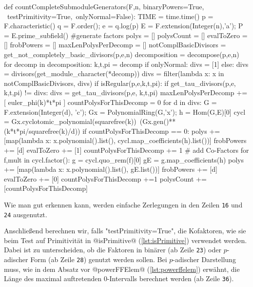 \begin{sagecode}[caption={Aus \url{../Sage/enumeratePCNs.spyx}}]
def countCompleteSubmoduleGenerators(F,n, binaryPowers=True, \
        testPrimitivity=True,\
        onlyNormal=False):
    TIME = time.time()
    p = F.characteristic()
    q = F.order();
    e = q.log(p)
    E = F.extension(Integer(n),'a');
    P = E.prime_subfield()
    #generate factors
    polys = []
    polysCount = []
    evalToZero = []
    frobPowers = []
    maxLenPolysPerDecomp = []
    notComplBasicDivisors = get_not_completely_basic_divisors(p,e,n)
    decomposition = decompose(p,e,n)
    for decomp in decomposition:
        k,t,pi = decomp
        if onlyNormal:
            divs = [1]
        else:
            divs = divisors(get_module_character(*decomp))
            divs = filter(lambda x: x in notComplBasicDivisors, divs)
            if isRegular(p,e,k,t,pi):
                if get_tau_divisors(p,e, k,t,pi) != divs:
                    divs = get_tau_divisors(p,e, k,t,pi)
        maxLenPolysPerDecomp += [ euler_phi(k)*t*pi ]
        countPolysForThisDecomp = 0
        for d in divs:
            G = F.extension(Integer(d), 'c');
            Gx = PolynomialRing(G,'x'); 
            h = Hom(G,E)[0]
            cycl = Gx.cyclotomic_polynomial(squarefree(k))\
                    (Gx.gen()**(k*t*pi/squarefree(k)/d))
            if countPolysForThisDecomp == 0:
                polys += [map(lambda x: x.polynomial().list(),
                    cycl.map_coefficients(h).list())]
                frobPowers += [d]
                evalToZero += [1]
                countPolysForThisDecomp += 1
            # add Co-Factors
            for f,mult in cycl.factor():
                g = cycl.quo_rem(f)[0]
                gE = g.map_coefficients(h)
                polys += [map(lambda x: x.polynomial().list(), gE.list())]
                frobPowers += [d]
                evalToZero += [0]
                countPolysForThisDecomp +=1
        polysCount += [countPolysForThisDecomp]
\end{sagecode}

Wie man gut erkennen kann, werden einfache Zerlegungen in den Zeilen
\texttt{16} und \texttt{24} ausgenutzt.

Anschließend berechnen wir, falls "testPrimitivity=True",
die Kofaktoren, wie sie beim Test auf Primitivität
in @isPrimitive@ (\autoref{lst:isPrimitive}) verwendet werden. Dabei ist zu
unterscheiden, ob die Faktoren in binärer (ab Zeile \texttt{23})
oder $p$-adischer Form (ab Zeile \texttt{28}) genutzt werden
sollen. Bei $p$-adischer Darstellung muss, wie in dem Absatz vor 
@powerFFElem@ (\autoref{lst:powerffelem}) erwähnt, die Länge des maximal
auftretenden $0$-Intervalls berechnet werden (ab Zeile \texttt{36}).

